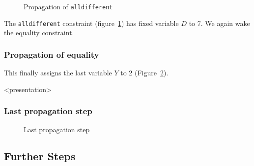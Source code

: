 \begin{figure}[ht]
\caption{\label{sendmore:alldifferentprop4}Propagation of \texttt{alldifferent}}
\begin{center}

\end{center}
\end{figure}


The \texttt{alldifferent} constraint (figure~\ref{sendmore:alldifferentprop4}) has fixed variable $D$ to 7. We again wake the equality constraint.

\begin{frame}
\frametitle{Propagation of equality}
\end{frame}

This finally assigns the last variable $Y$ to 2 (Figure~\ref{sendmore:lastprop}).

\begin{frame}<presentation>
\frametitle{Last propagation step}
\begin{center}

\end{center}
\end{frame}

\begin{figure}[ht]
\caption{\label{sendmore:lastprop}Last propagation step}
\begin{center}

\end{center}
\end{figure}


\subsection{Further Steps}

